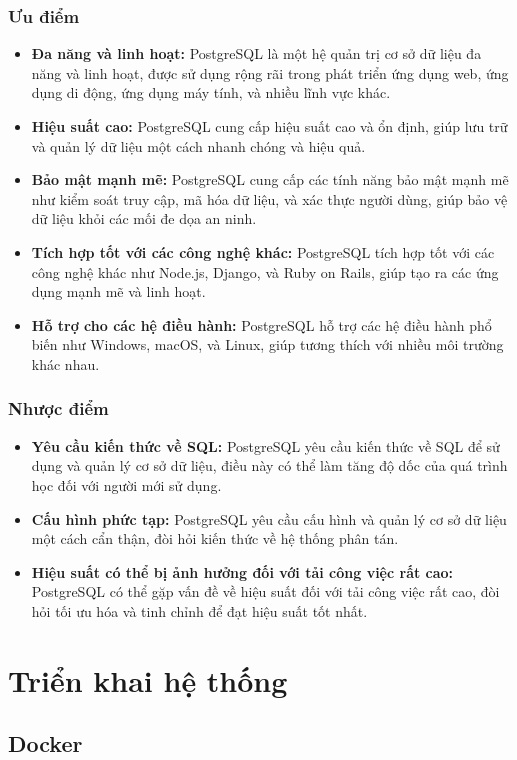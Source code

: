 \subsubsection{Ưu điểm}
\begin{itemize}
  \item \textbf{Đa năng và linh hoạt:} PostgreSQL là một hệ quản trị cơ sở dữ liệu đa năng và linh hoạt, được sử dụng rộng rãi trong phát triển ứng dụng web, ứng dụng di động, ứng dụng máy tính, và nhiều lĩnh vực khác.
  \item \textbf{Hiệu suất cao:} PostgreSQL cung cấp hiệu suất cao và ổn định, giúp lưu trữ và quản lý dữ liệu một cách nhanh chóng và hiệu quả.
  \item \textbf{Bảo mật mạnh mẽ:} PostgreSQL cung cấp các tính năng bảo mật mạnh mẽ như kiểm soát truy cập, mã hóa dữ liệu, và xác thực người dùng, giúp bảo vệ dữ liệu khỏi các mối đe dọa an ninh.
  \item \textbf{Tích hợp tốt với các công nghệ khác:} PostgreSQL tích hợp tốt với các công nghệ khác như Node.js, Django, và Ruby on Rails, giúp tạo ra các ứng dụng mạnh mẽ và linh hoạt.
  \item \textbf{Hỗ trợ cho các hệ điều hành:} PostgreSQL hỗ trợ các hệ điều hành phổ biến như Windows, macOS, và Linux, giúp tương thích với nhiều môi trường khác nhau.
\end{itemize}
\subsubsection{Nhược điểm}
\begin{itemize}
  \item \textbf{Yêu cầu kiến thức về SQL:} PostgreSQL yêu cầu kiến thức về SQL để sử dụng và quản lý cơ sở dữ liệu, điều này có thể làm tăng độ dốc của quá trình học đối với người mới sử dụng.
  \item \textbf{Cấu hình phức tạp:} PostgreSQL yêu cầu cấu hình và quản lý cơ sở dữ liệu một cách cẩn thận, đòi hỏi kiến thức về hệ thống phân tán.
  \item \textbf{Hiệu suất có thể bị ảnh hưởng đối với tải công việc rất cao:} PostgreSQL có thể gặp vấn đề về hiệu suất đối với tải công việc rất cao, đòi hỏi tối ưu hóa và tinh chỉnh để đạt hiệu suất tốt nhất.
\end{itemize}
\section{Triển khai hệ thống}
\subsection{Docker}
